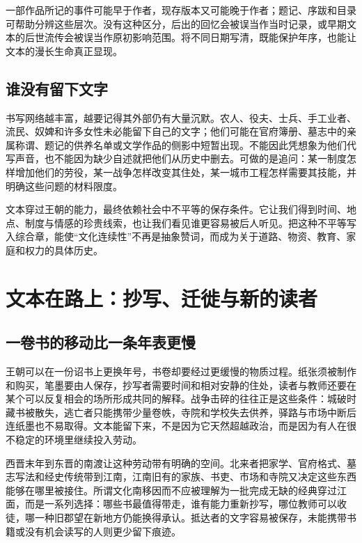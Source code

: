 \begin{sourcenote}
一部作品所记的事件可能早于作者，现存版本又可能晚于作者；题记、序跋和目录可帮助分辨这些层次。没有这种区分，后出的回忆会被误当作当时记录，或早期文本的后世流传会被误当作原初影响范围。将不同日期写清，既能保护年序，也能让文本的漫长生命真正显现。
\end{sourcenote}

\subsection{谁没有留下文字}

书写网络越丰富，越要记得其外部仍有大量沉默。农人、役夫、士兵、手工业者、流民、奴婢和许多女性未必能留下自己的文字；他们可能在官府簿册、墓志中的亲属称谓、题记的供养名单或文学作品的侧影中短暂出现。不能因此凭想象为他们代写声音，也不能因为缺少自述就把他们从历史中删去。可做的是追问：某一制度怎样增加他们的劳役，某一战争怎样改变其住处，某一城市工程怎样需要其技能，并明确这些问题的材料限度。

文本穿过王朝的能力，最终依赖社会中不平等的保存条件。它让我们得到时间、地点、制度与情感的珍贵线索，也让我们看见谁更容易被后人听见。把这种不平等写入综合章，能使“文化连续性”不再是抽象赞词，而成为关于道路、物资、教育、家庭和权力的具体历史。

\section{文本在路上：抄写、迁徙与新的读者}

\subsection{一卷书的移动比一条年表更慢}

王朝可以在一份诏书上更换年号，书卷却要经过更缓慢的物质过程。纸张须被制作和购买，笔墨要由人保存，抄写者需要时间和相对安静的住处，读者与教师还要在某个可以反复相会的场所形成共同的解释。战争击碎的往往正是这些条件：城破时藏书被散失，逃亡者只能携带少量卷帙，寺院和学校失去供养，驿路与市场中断后连纸墨也不易取得。文本能留下来，不是因为它天然超越政治，而是因为有人在很不稳定的环境里继续投入劳动。

西晋末年到东晋的南渡让这种劳动带有明确的空间。北来者把家学、官府格式、墓志写法和经史传统带到江南，江南旧有的家族、书吏、市场和寺院又决定这些东西能够在哪里被接住。所谓文化南移因而不应被理解为一批完成无缺的经典穿过江面，而是一系列选择：哪些书最值得带走，谁有能力重新抄写，哪位教师可以收徒，哪一种旧郡望在新地方仍能换得承认。抵达者的文字容易被保存，未能携带书籍或没有机会读写的人则更少留下痕迹。

